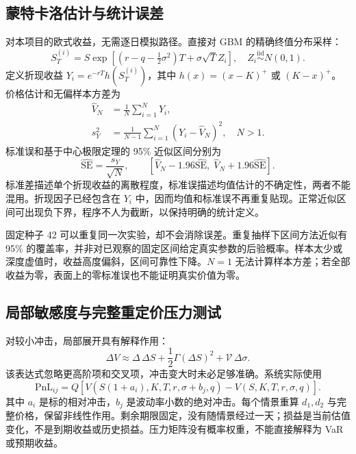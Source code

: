 \documentclass[UTF8,a4paper,12pt]{ctexart}
\begin{document}
\subsection{蒙特卡洛估计与统计误差}
对本项目的欧式收益，无需逐日模拟路径。直接对 GBM 的精确终值分布采样：
\begin{equation}
S_T^{(i)}=S\exp\left[(r-q-\tfrac12\sigma^2)T+\sigma\sqrt T Z_i\right],
\quad Z_i\overset{\mathrm{iid}}\sim N(0,1).
\end{equation}
定义折现收益 $Y_i=e^{-rT}h(S_T^{(i)})$，其中 $h(x)=(x-K)^+$ 或 $(K-x)^+$。价格估计和无偏样本方差为
\begin{align}
\widehat V_N&=\frac1N\sum_{i=1}^NY_i,\\
s_Y^2&=\frac1{N-1}\sum_{i=1}^N(Y_i-\widehat V_N)^2,\quad N>1.
\end{align}
标准误和基于中心极限定理的 95\% 近似区间分别为
\begin{equation}
\widehat{\mathrm{SE}}=\frac{s_Y}{\sqrt N},\qquad
\left[\widehat V_N-1.96\widehat{\mathrm{SE}},\;
\widehat V_N+1.96\widehat{\mathrm{SE}}\right].
\end{equation}
标准差描述单个折现收益的离散程度，标准误描述均值估计的不确定性，两者不能混用。折现因子已经包含在 $Y_i$ 中，因而均值和标准误不再重复贴现。正常近似区间可出现负下界，程序不人为截断，以保持明确的统计定义。

固定种子 42 可以重复同一次实验，却不会消除误差。重复抽样下区间方法近似有 95\% 的覆盖率，并非对已观察的固定区间给定真实参数的后验概率。样本太少或深度虚值时，收益高度偏斜，区间可靠性下降。$N=1$ 无法计算样本方差；若全部收益为零，表面上的零标准误也不能证明真实价值为零。

\subsection{局部敏感度与完整重定价压力测试}
对较小冲击，局部展开具有解释作用：
\begin{equation}
\Delta V\approx\Delta\,\Delta S+\frac12\Gamma(\Delta S)^2
+\mathcal V\,\Delta\sigma.
\end{equation}
该表达式忽略更高阶项和交叉项，冲击变大时未必足够准确。系统实际使用
\begin{equation}
\mathrm{PnL}_{ij}=Q\left[V\!\left(S(1+a_i),K,T,r,\sigma+b_j,q\right)
-V(S,K,T,r,\sigma,q)\right].\label{eq:stress}
\end{equation}
其中 $a_i$ 是标的相对冲击，$b_j$ 是波动率小数的绝对冲击。每个情景重算 $d_1,d_2$ 与完整价格，保留非线性作用。剩余期限固定，没有随情景经过一天；损益是当前估值变化，不是到期收益或历史损益。压力矩阵没有概率权重，不能直接解释为 VaR 或预期收益。
\newpage
\end{document}
